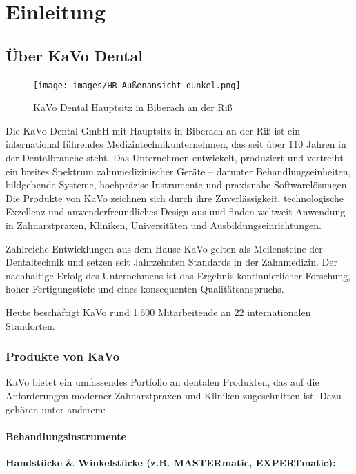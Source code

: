 \chapter{Einleitung}

\section{Über KaVo Dental}

\vspace{-1em}  %
\begin{figure}[H]
    \centering
    \texttt{[image: images/HR-Außenansicht-dunkel.png]}
    \caption{KaVo Dental Hauptsitz in Biberach an der Riß}
    \label{fig:kavo_headquarters}
\end{figure}

Die KaVo Dental GmbH mit Hauptsitz in Biberach an der Riß ist ein international führendes Medizintechnikunternehmen, das seit über 110 Jahren in der Dentalbranche steht. Das Unternehmen entwickelt, produziert und vertreibt ein breites Spektrum zahnmedizinischer Geräte – darunter Behandlungseinheiten, bildgebende Systeme, hochpräzise Instrumente und praxisnahe Softwarelösungen. Die Produkte von KaVo zeichnen sich durch ihre Zuverlässigkeit, technologische Exzellenz und anwenderfreundliches Design aus und finden weltweit Anwendung in Zahnarztpraxen, Kliniken, Universitäten und Ausbildungseinrichtungen.

 
Zahlreiche Entwicklungen aus dem Hause KaVo gelten als Meilensteine der Dentaltechnik und setzen seit Jahrzehnten Standards in der Zahnmedizin. Der nachhaltige Erfolg des Unternehmens ist das Ergebnis kontinuierlicher Forschung, hoher Fertigungstiefe und eines konsequenten Qualitätsanspruchs.

Heute beschäftigt KaVo rund 1.600 Mitarbeitende an 22 internationalen Standorten.

\subsection{Produkte von KaVo}

KaVo bietet ein umfassendes Portfolio an dentalen Produkten, das auf die Anforderungen moderner Zahnarztpraxen und Kliniken zugeschnitten ist. Dazu gehören unter anderem:


\subsubsection{Behandlungsinstrumente}
\textbf{Handstücke \& Winkelstücke (z.B. MASTERmatic, EXPERTmatic):}

